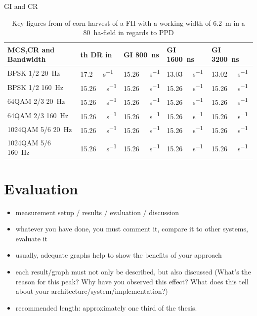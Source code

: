 \documentclass[]{nsm-thesis}
\begin{document}
\ac{GI} and \ac{CR}
\begin{table}
	\centering
	\begin{tabular}{>{\raggedright}p{2.2cm}p{1.9cm}p{1.9cm}p{1.9cm}p{1.9cm}}
		\toprule
		\ac{MCS},\ac{CR} and Bandwidth & th DR in & \ac{GI} \SI{800}{\nano\second} & \ac{GI} \SI{1600}{\nano\second} & \ac{GI} \SI{3200}{\nano\second}\\
		\midrule
		BPSK 1/2 \SI{20}{\hertz} & \SI{17.2}{\mega\bit\per\second}&
		 \SI{15.26}{\mega\bit\per\second} &  \SI{13.03}{\mega\bit\per\second} &  \SI{13.02}{\mega\bit\per\second} \\
		BPSK 1/2 \SI{160}{\hertz} & \SI{15.26}{\mega\bit\per\second}&
		\SI{15.26}{\mega\bit\per\second} &  \SI{15.26}{\mega\bit\per\second} &  \SI{15.26}{\mega\bit\per\second}\\
		64QAM 2/3 \SI{20}{\hertz}& \SI{15.26}{\mega\bit\per\second}&
		\SI{15.26}{\mega\bit\per\second} &  \SI{15.26}{\mega\bit\per\second} &  \SI{15.26}{\mega\bit\per\second}\\
		64QAM 2/3 \SI{160}{\hertz}& \SI{15.26}{\mega\bit\per\second}&
		\SI{15.26}{\mega\bit\per\second} &  \SI{15.26}{\mega\bit\per\second} &  \SI{15.26}{\mega\bit\per\second}\\
		1024QAM 5/6 \SI{20}{\hertz} &\SI{15.26}{\mega\bit\per\second}&
		\SI{15.26}{\mega\bit\per\second} &  \SI{15.26}{\mega\bit\per\second} &  \SI{15.26}{\mega\bit\per\second}\\
		1024QAM 5/6 \SI{160}{\hertz} &\SI{15.26}{\mega\bit\per\second}&
		\SI{15.26}{\mega\bit\per\second} &  \SI{15.26}{\mega\bit\per\second} &  \SI{15.26}{\mega\bit\per\second}\\
		\bottomrule
	\end{tabular}
	\caption{Key figures from \cite{faustzahlen2018} of corn harvest of a \ac{FH} with a working width of \SI{6.2}{\metre} in a \SI{80}{\hectare}-field in regards to \ac{PPD}}
	\label{tab:DataRate}
\end{table}


\chapter{Evaluation}


\begin{itemize}
\item measurement setup / results / evaluation / discussion
\item whatever you have done, you must comment it, compare it to other systems, evaluate it
\item usually, adequate graphs help to show the benefits of your approach
\item each result/graph must not only be described, but also discussed (What's the reason for this peak? Why have you observed this effect? What does this tell about your architecture/system/implementation?)
\item recommended length: approximately one third of the thesis.
\end{itemize}
\end{document}
